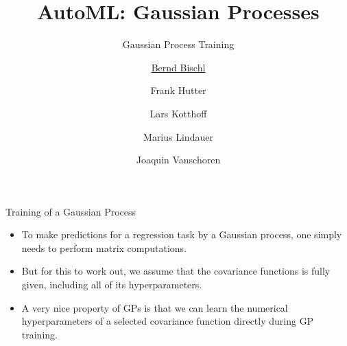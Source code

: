 



\newcommand{\lz}{\vspace{0.5cm}}
\newcommand{\thetab}{\bm{\weights}}
\newcommand{\zero}{\mathbf{0}}
\newcommand{\Xmat}{\mathbf{X}}
\newcommand{\ydat}{\mathbf{y}}
\newcommand{\id}{\boldsymbol{I}}
\newcommand{\Amat}{\mathbf{A}}
\newcommand{\Xspace}{\mathcal{X}}
\newcommand{\Yspace}{\mathcal{Y}}
\newcommand{\ls}{\ell}
\newcommand{\natnum}{\mathbb{N}}
\newcommand{\intnum}{\mathbb{Z}}
\newcommand{\order}{\mathcal{O}}

\usepackage{fontawesome}
\usepackage{dirtytalk}
\usepackage{csquotes}


\def\argmin{\mathop{\sf arg\,min}}




\title[AutoML: GPs]{AutoML: Gaussian Processes} %
\subtitle{Gaussian Process Training} %
\author[Marius Lindauer]{\underline{Bernd Bischl} \and Frank Hutter \and Lars Kotthoff\newline \and Marius Lindauer \and Joaquin Vanschoren}
\institute{}
\date{}




\maketitle



\begin{frame}[c]{Training of a Gaussian Process}

\begin{itemize}
\vspace{.5cm}
\item To make predictions for a regression task by a Gaussian process, one simply needs to perform matrix computations.
\vspace{.5cm}
\item But for this to work out, we assume that the covariance functions is fully given, including all of its hyperparameters.
\vspace{.5cm}
\item A very nice property of GPs is that we can learn the numerical hyperparameters of a selected covariance function directly during GP training.
\end{itemize}


\end{frame}

